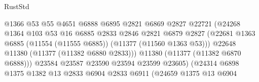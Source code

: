 \begin{lexlean}{RustStd}
\begin{coremodule}
                                            @1366
                                            @53
                                            @55
                                            @4651
                                            @6888
                                            @6895
                                            @2821
                                            @6869
                                            @2827
                                            @22721
                                            (@24268
                                              @1364
                                              @103
                                              @53
                                              @16
                                              @6885
                                              @2833
                                              @2846
                                              @2821
                                              @6879
                                              @2827
                                              (@22681
                                                @1363
                                                @6885
                                                (@11554 (@11555 @6885))
                                                (@11377 (@11560 @1363 @53)))
                                              @22648
                                              @11380
                                              (@11377 (@11382 @6880 @2833)))
                                            @11380
                                            (@11377 (@11382 @6870 @6888)))
                                          @23584
                                          @23587
                                          @23590
                                          @23594
                                          @23599
                                          @23605)
                                        (@24314
                                          @6898
                                          @1375
                                          @1382
                                          @13
                                          @2833
                                          @6904
                                          @2833
                                          @6911
                                          (@24659
                                            @1375
                                            @13
                                            @6904

\end{coremodule}
\end{lexlean}
